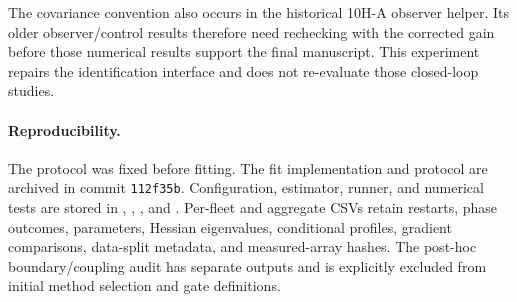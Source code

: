 The covariance convention also occurs in the historical 10H-A observer
helper. Its older observer/control results therefore need rechecking with
the corrected gain before those numerical results support the final
manuscript. This experiment repairs the identification interface and does
not re-evaluate those closed-loop studies.

\paragraph{Reproducibility.}
The protocol was fixed before fitting. The fit implementation and protocol
are archived in commit \texttt{112f35b}. Configuration,
estimator, runner, and numerical tests are stored in
,
,
, and
. Per-fleet and aggregate CSVs retain
restarts, phase outcomes, parameters, Hessian eigenvalues, conditional
profiles, gradient comparisons, data-split metadata, and measured-array
hashes. The post-hoc boundary/coupling audit has separate outputs and is
explicitly excluded from initial method selection and gate definitions.
